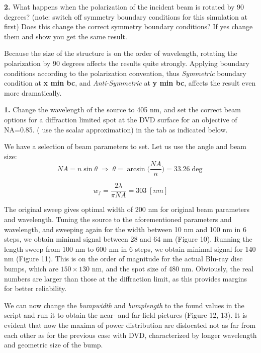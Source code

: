 \documentclass[11pt,a4paper]{article}
\begin{document}
\begin{displayquote}
    \textbf{2. } What happens when the polarization of the incident beam is rotated by 90 degrees? (note: switch off symmetry boundary conditions for this simulation at first) Does this change the correct symmetry boundary conditions? If yes change them and show you get the same result.
\end{displayquote}

Because the size of the structure is on the order of wavelength, rotating the polarization by 90 degrees affects the results quite strongly. Applying boundary conditions according to the polarization convention, thus \textit{Symmetric} boundary condition at \textbf{x min bc}, and \textit{Anti-Symmetric} at \textbf{y min bc}, affects the result even more dramatically. 

\begin{displayquote}
    \textbf{1.} Change the wavelength of the source to 405 nm, and set the correct beam options for a diffraction limited spot at the DVD surface for an objective of NA=0.85. ( use the scalar approximation) in the tab as indicated below.
\end{displayquote}

We have a selection of beam parameters to set. Let us use the angle and beam size: 
\begin{equation*}
    NA=n\sin{\theta} \; \Rightarrow \; \theta=\arcsin{\bigg(\frac{NA}{n}\bigg)}=33.26\deg
\end{equation*}

\begin{equation*}
    w_f=\frac{2\lambda}{\pi NA}= 303 \; [nm]
\end{equation*}

The original sweep gives optimal width of 200 nm for original beam parameters and wavelength. Tuning the source to the aforementioned parameters and wavelength, and sweeping again for the width between 10 nm and 100 nm in 6 steps, we obtain minimal signal between 28 and 64 nm (Figure 10). Running the length sweep from 100 nm to 600 nm in 6 steps, we obtain minimal signal for 140 nm (Figure 11). This is on the order of magnitude for the actual Blu-ray disc bumps, which are $150\times 130$ nm, and the spot size of 480 nm. Obviously, the real numbers are larger than those at the diffraction limit, as this provides margins for better reliability. 

We can now change the \textit{bumpwidth} and \textit{bumplength} to the found values in the script and run it to obtain the near- and far-field pictures (Figure 12, 13). It is evident that now the maxima of power distribution are dislocated not as far from each other as for the previous case with DVD, characterized by longer wavelength and geometric size of the bump. 
\end{document}
